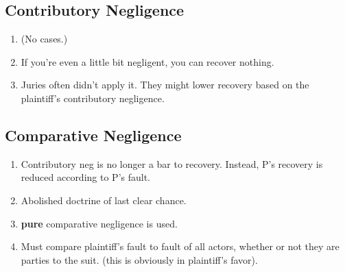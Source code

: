%
%
%
%
%
%

\subsection{Contributory Negligence}

\begin{enumerate}
    \item (No cases.)
    \item If you're even a little bit negligent, you can recover nothing.
    \item Juries often didn't apply it. They might lower recovery based on the plaintiff's contributory negligence.
\end{enumerate}

\subsection{Comparative Negligence}

\begin{enumerate}
    \item Contributory neg is no longer a bar to recovery. Instead, P's recovery is reduced according to P's fault.
    \item Abolished doctrine of last clear chance.
    \item \textbf{pure} comparative negligence is used.
    \item Must compare plaintiff's fault to fault of all actors, whether or not they are parties to the suit. (this is obviously in plaintiff's favor).
\end{enumerate}

